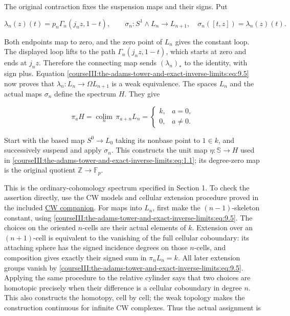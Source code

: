 The original contraction fixes the suspension maps and their signs. Put

\begin{equation}
\lambda_n(z)(t)=p_n\Gamma_n(j_nz,1-t),\qquad
 \sigma_n:S^1\wedge L_n\longrightarrow L_{n+1},
 \quad \sigma_n([t,z])=\lambda_n(z)(t).
 \label{courseIII:the-adams-tower-and-exact-inverse-limits:eq:9.6}
\end{equation}

Both endpoints map to zero, and the zero point of \(L_n\) gives the constant loop. The displayed loop lifts to the path \(\Gamma_n(j_nz,1-t)\), which starts at zero and ends at \(j_nz\). Therefore the connecting map sends \((\lambda_n)_*\) to the identity, with sign plus. Equation \eqref{courseIII:the-adams-tower-and-exact-inverse-limits:eq:9.5} now proves that \(\lambda_n:L_n\to\Omega L_{n+1}\) is a weak equivalence. The spaces \(L_n\) and the actual maps \(\sigma_n\) define the spectrum \(H\). They give

\begin{equation}
\pi_a H=\underset{n}{\operatorname{colim}}\,
          \pi_{a+n}L_n
  =\begin{cases}k,&a=0,\\0,&a\ne0.\end{cases}
 \label{courseIII:the-adams-tower-and-exact-inverse-limits:eq:9.7}
\end{equation}

Start with the based map \(S^0\to L_0\) taking its nonbase point to \(1\in k\), and successively suspend and apply \(\sigma_n\). This constructs the unit map \(\eta:\mathbb S\to H\) used in \eqref{courseIII:the-adams-tower-and-exact-inverse-limits:eq:1.1}; its degree-zero map is the original quotient \(\mathbb Z\to\mathbb F_p\).

This is the ordinary-cohomology spectrum specified in Section 1. To check the assertion directly, use the CW models and cellular extension procedure proved in the included \href{https://github.com/KokunoYumeto/open-math-courses/blob/98715557b25d715076184ec098089ebae34ea9f6/docs/courses/CG-S6/src/cw-models-and-the-first-hurewicz-map.md}{CW companion}. For maps into \(L_n\), first make the \((n-1)\)-skeleton constant, using \eqref{courseIII:the-adams-tower-and-exact-inverse-limits:eq:9.5}. The choices on the oriented \(n\)-cells are their actual elements of \(k\). Extension over an \((n+1)\)-cell is equivalent to the vanishing of the full cellular coboundary: its attaching sphere has the signed incidence degrees on those \(n\)-cells, and composition gives exactly their signed sum in \(\pi_nL_n=k\). All later extension groups vanish by \eqref{courseIII:the-adams-tower-and-exact-inverse-limits:eq:9.5}. Applying the same procedure to the relative cylinder says that two choices are homotopic precisely when their difference is a cellular coboundary in degree \(n\). This also constructs the homotopy, cell by cell; the weak topology makes the construction continuous for infinite CW complexes. Thus the actual assignment is

